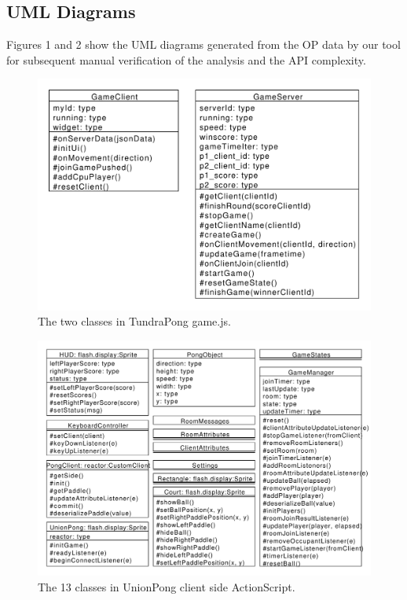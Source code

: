 \documentclass[conference]{IEEEtran}
\begin{document}
\subsection{UML Diagrams%
  \label{uml-diagrams}%
}

Figures 1 and 2 show the UML diagrams generated from the OP data by
our tool for subsequent manual verification of the analysis and the
API complexity.
\begin{figure}
\includegraphics[scale=0.400000]{pics/TundraPong.pdf}
\caption{The two classes in TundraPong game.js.}
\end{figure}
\begin{figure}
\includegraphics[scale=0.350000]{pics/UnionPong-manuallayout.pdf}
\caption{The 13 classes in UnionPong client side ActionScript.}
\end{figure}
\end{document}
